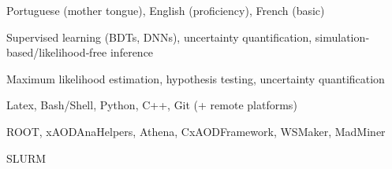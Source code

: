 
\begin{cvskills}

{Portuguese (mother tongue), English (proficiency), French (basic)}

{Supervised learning (BDTs, DNNs), uncertainty quantification, simulation‐based/likelihood‐free inference}

{Maximum likelihood estimation, hypothesis testing, uncertainty quantification}

{Latex, Bash/Shell, Python, C++, Git (+ remote platforms)}

{ROOT, xAODAnaHelpers, Athena, CxAODFramework, WSMaker, MadMiner}

{SLURM}

\end{cvskills}